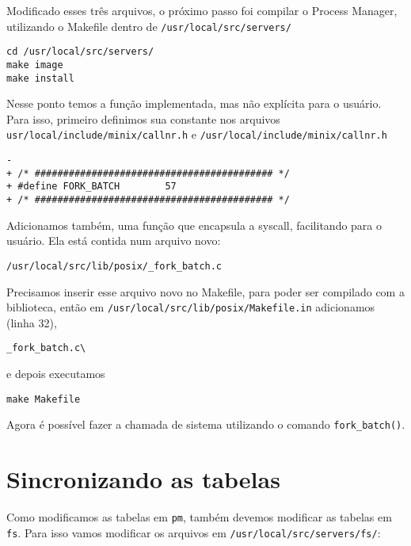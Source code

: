 \documentclass{amsart}
\theoremstyle{plain}
\newcommand{\code}[1]{\lstinline[mathescape=true]{#1}}
\begin{document}
Modificado esses três arquivos, o próximo passo foi compilar o Process Manager, utilizando o
Makefile dentro de \code{/usr/local/src/servers/}

\begin{lstlisting}[frame=leftline,mathescape=true,style=nonumbers]
cd /usr/local/src/servers/
make image
make install
\end{lstlisting}

Nesse ponto temos a função implementada, mas não explícita para o usuário. Para isso, primeiro
definimos sua constante nos arquivos \code{usr/local/include/minix/callnr.h} e
\code{/usr/local/include/minix/callnr.h}

\begin{lstlisting}[frame=leftline,mathescape=true,style=nonumbers]
-
+ /* ########################################## */
+ #define FORK_BATCH        57
+ /* ########################################## */
\end{lstlisting}

Adicionamos também, uma função que encapsula a syscall, facilitando para o usuário. Ela está
contida num arquivo novo:

\begin{lstlisting}[frame=leftline,mathescape=true,style=nonumbers]
/usr/local/src/lib/posix/_fork_batch.c
\end{lstlisting}

Precisamos inserir esse arquivo novo no Makefile, para poder ser compilado com a biblioteca, então
em \code{/usr/local/src/lib/posix/Makefile.in} adicionamos (linha 32),

\begin{lstlisting}[frame=leftline,mathescape=true,style=nonumbers]
_fork_batch.c\
\end{lstlisting}

e depois executamos

\begin{lstlisting}[frame=leftline,mathescape=true,style=nonumbers]
make Makefile
\end{lstlisting}

Agora é possível fazer a chamada de sistema utilizando o comando \code{fork_batch()}.

\section{Sincronizando as tabelas}

Como modificamos as tabelas em \code{pm}, também devemos modificar as tabelas em \code{fs}. Para
isso vamos modificar os arquivos em \code{/usr/local/src/servers/fs/}:
\end{document}
